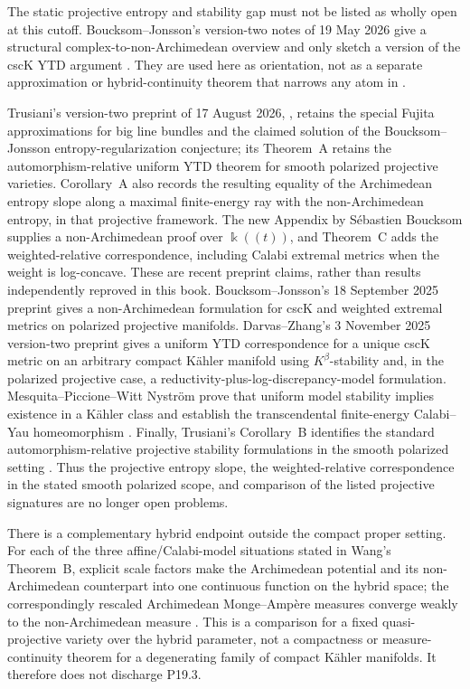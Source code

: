 The static projective entropy and stability gap must not be listed as wholly
open at this cutoff.  Boucksom--Jonsson's version-two notes of 19 May 2026
give a structural complex-to-non-Archimedean overview and only sketch a
version of the cscK YTD argument \cite{BJ26ComplexNA}.  They are used here
as orientation, not as a separate approximation or hybrid-continuity theorem
that narrows any atom in .

Trusiani's version-two preprint of 17 August 2026,
\cite[Theorem~B and Corollary~A]{Trusiani26}, retains the special Fujita
approximations for big line bundles and the claimed solution of the
Boucksom--Jonsson entropy-regularization conjecture; its Theorem~A retains
the automorphism-relative uniform YTD theorem for smooth polarized
projective varieties.  Corollary~A also records the resulting equality of
the Archimedean entropy slope along a maximal finite-energy ray with the
non-Archimedean entropy, in that projective framework.  The new Appendix by
S\'ebastien Boucksom supplies a non-Archimedean proof over
\(\Bbbk((t))\), and Theorem~C adds the weighted-relative correspondence,
including Calabi extremal metrics when the weight is log-concave.  These are
recent preprint claims, rather than results independently reproved in this
book.  Boucksom--Jonsson's 18 September 2025
preprint \cite{BJ25WeightedYTD} gives a
non-Archimedean formulation for cscK and weighted extremal metrics on
polarized projective manifolds.  Darvas--Zhang's 3 November 2025 version-two
preprint \cite[Theorems~1.6 and~5.5]{DarvasZhang25YTD} gives a uniform
YTD correspondence for a unique cscK metric on an arbitrary compact
Kähler manifold using \(K^\beta\)-stability and, in the polarized
projective case, a reductivity-plus-log-discrepancy-model formulation.
Mesquita--Piccione--Witt Nyström prove that uniform model stability implies
existence in a Kähler class and establish the transcendental finite-energy
Calabi--Yau homeomorphism \cite[Theorems~A and~B]{MPWN25}.  Finally,
Trusiani's Corollary~B identifies the standard automorphism-relative
projective stability formulations in the smooth polarized setting
\cite{Trusiani26}.  Thus the projective entropy slope, the weighted-relative
correspondence in the stated smooth polarized scope, and comparison of the
listed projective signatures are no longer open problems.

There is a complementary hybrid endpoint outside the compact proper setting.
For each of the three affine/Calabi-model situations stated in Wang's
Theorem~B, explicit scale factors make the Archimedean potential and its
non-Archimedean counterpart into one continuous function on the hybrid space;
the correspondingly rescaled Archimedean Monge--Amp\`ere measures converge
weakly to the non-Archimedean measure \cite[Theorem~B]{Wang25NACalabiYau}.
This is a comparison for a fixed quasi-projective variety over the hybrid
parameter, not a compactness or measure-continuity theorem for a degenerating
family of compact K\"ahler manifolds.  It therefore does not discharge
P19.3.

